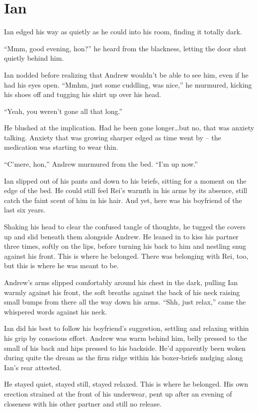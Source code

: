 \chapter{Ian}

Ian edged his way as quietly as he could into his room, finding it totally dark.

``Mmm, good evening, hon?'' he heard from the blackness, letting the door shut quietly behind him.

Ian nodded before realizing that Andrew wouldn't be able to see him, even if he had his eyes open. ``Mmhm, just some cuddling, was nice,'' he murmured, kicking his shoes off and tugging his shirt up over his head.

``Yeah, you weren't gone all that long.''

He blushed at the implication. Had he been gone longer\ldots{}but no, that was anxiety talking. Anxiety that was growing sharper edged as time went by -- the medication was starting to wear thin.

``C'mere, hon,'' Andrew murmured from the bed. ``I'm up now.''

Ian slipped out of his pants and down to his briefs, sitting for a moment on the edge of the bed. He could still feel Rei's warmth in his arms by its absence, still catch the faint scent of him in his hair. And yet, here was his boyfriend of the last six years.

Shaking his head to clear the confused tangle of thoughts, he tugged the covers up and slid beneath them alongside Andrew. He leaned in to kiss his partner three times, softly on the lips, before turning his back to him and nestling snug against his front. This is where he belonged. There was belonging with Rei, too, but this is where he was meant to be.

Andrew's arms slipped comfortably around his chest in the dark, pulling Ian warmly against his front, the soft breaths against the back of his neck raising small bumps from there all the way down his arms. ``Shh, just relax,'' came the whispered words against his neck.

Ian did his best to follow his boyfriend's suggestion, settling and relaxing within his grip by conscious effort. Andrew was warm behind him, belly pressed to the small of his back and hips pressed to his backside. He'd apparently been woken during quite the dream as the firm ridge within his boxer-briefs nudging along Ian's rear attested.

He stayed quiet, stayed still, stayed relaxed. This is where he belonged. His own erection strained at the front of his underwear, pent up after an evening of closeness with his other partner and still no release.

